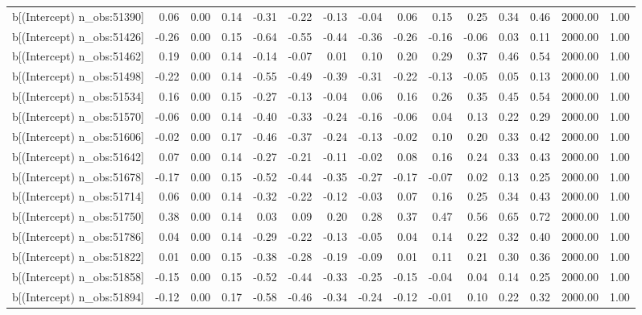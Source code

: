 \begin{table}[ht]
\begin{tabular}{rrrrrrrrrrrrrrr}
  b[(Intercept) n\_obs:51390] & 0.06 & 0.00 & 0.14 & -0.31 & -0.22 & -0.13 & -0.04 & 0.06 & 0.15 & 0.25 & 0.34 & 0.46 & 2000.00 & 1.00 \\ 
  b[(Intercept) n\_obs:51426] & -0.26 & 0.00 & 0.15 & -0.64 & -0.55 & -0.44 & -0.36 & -0.26 & -0.16 & -0.06 & 0.03 & 0.11 & 2000.00 & 1.00 \\ 
  b[(Intercept) n\_obs:51462] & 0.19 & 0.00 & 0.14 & -0.14 & -0.07 & 0.01 & 0.10 & 0.20 & 0.29 & 0.37 & 0.46 & 0.54 & 2000.00 & 1.00 \\ 
  b[(Intercept) n\_obs:51498] & -0.22 & 0.00 & 0.14 & -0.55 & -0.49 & -0.39 & -0.31 & -0.22 & -0.13 & -0.05 & 0.05 & 0.13 & 2000.00 & 1.00 \\ 
  b[(Intercept) n\_obs:51534] & 0.16 & 0.00 & 0.15 & -0.27 & -0.13 & -0.04 & 0.06 & 0.16 & 0.26 & 0.35 & 0.45 & 0.54 & 2000.00 & 1.00 \\ 
  b[(Intercept) n\_obs:51570] & -0.06 & 0.00 & 0.14 & -0.40 & -0.33 & -0.24 & -0.16 & -0.06 & 0.04 & 0.13 & 0.22 & 0.29 & 2000.00 & 1.00 \\ 
  b[(Intercept) n\_obs:51606] & -0.02 & 0.00 & 0.17 & -0.46 & -0.37 & -0.24 & -0.13 & -0.02 & 0.10 & 0.20 & 0.33 & 0.42 & 2000.00 & 1.00 \\ 
  b[(Intercept) n\_obs:51642] & 0.07 & 0.00 & 0.14 & -0.27 & -0.21 & -0.11 & -0.02 & 0.08 & 0.16 & 0.24 & 0.33 & 0.43 & 2000.00 & 1.00 \\ 
  b[(Intercept) n\_obs:51678] & -0.17 & 0.00 & 0.15 & -0.52 & -0.44 & -0.35 & -0.27 & -0.17 & -0.07 & 0.02 & 0.13 & 0.25 & 2000.00 & 1.00 \\ 
  b[(Intercept) n\_obs:51714] & 0.06 & 0.00 & 0.14 & -0.32 & -0.22 & -0.12 & -0.03 & 0.07 & 0.16 & 0.25 & 0.34 & 0.43 & 2000.00 & 1.00 \\ 
  b[(Intercept) n\_obs:51750] & 0.38 & 0.00 & 0.14 & 0.03 & 0.09 & 0.20 & 0.28 & 0.37 & 0.47 & 0.56 & 0.65 & 0.72 & 2000.00 & 1.00 \\ 
  b[(Intercept) n\_obs:51786] & 0.04 & 0.00 & 0.14 & -0.29 & -0.22 & -0.13 & -0.05 & 0.04 & 0.14 & 0.22 & 0.32 & 0.40 & 2000.00 & 1.00 \\ 
  b[(Intercept) n\_obs:51822] & 0.01 & 0.00 & 0.15 & -0.38 & -0.28 & -0.19 & -0.09 & 0.01 & 0.11 & 0.21 & 0.30 & 0.36 & 2000.00 & 1.00 \\ 
  b[(Intercept) n\_obs:51858] & -0.15 & 0.00 & 0.15 & -0.52 & -0.44 & -0.33 & -0.25 & -0.15 & -0.04 & 0.04 & 0.14 & 0.25 & 2000.00 & 1.00 \\ 
  b[(Intercept) n\_obs:51894] & -0.12 & 0.00 & 0.17 & -0.58 & -0.46 & -0.34 & -0.24 & -0.12 & -0.01 & 0.10 & 0.22 & 0.32 & 2000.00 & 1.00 \\ 

\end{tabular}
\end{table}
